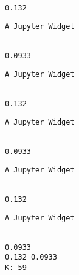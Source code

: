 \documentclass[11pt]{article}
\begin{document}
    
    \begin{Verbatim}[commandchars=\\\{\}]

0.132

    \end{Verbatim}

    
    \begin{verbatim}
A Jupyter Widget
    \end{verbatim}

    
    \begin{Verbatim}[commandchars=\\\{\}]

0.0933

    \end{Verbatim}

    
    \begin{verbatim}
A Jupyter Widget
    \end{verbatim}

    
    \begin{Verbatim}[commandchars=\\\{\}]

0.132

    \end{Verbatim}

    
    \begin{verbatim}
A Jupyter Widget
    \end{verbatim}

    
    \begin{Verbatim}[commandchars=\\\{\}]

0.0933

    \end{Verbatim}

    
    \begin{verbatim}
A Jupyter Widget
    \end{verbatim}

    
    \begin{Verbatim}[commandchars=\\\{\}]

0.132

    \end{Verbatim}

    
    \begin{verbatim}
A Jupyter Widget
    \end{verbatim}

    
    \begin{Verbatim}[commandchars=\\\{\}]

0.0933
0.132 0.0933
K: 59

    \end{Verbatim}
\end{document}
